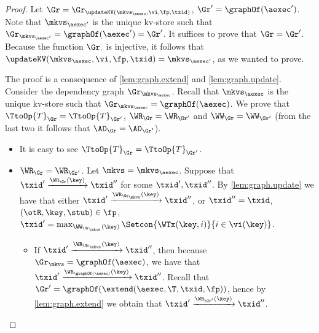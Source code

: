 \begin{proof}
Let $\Gr = \Gr_{\updateKV(\mkvs_{\aexec}, \vi, \fp, \txid)}$, $\Gr' = \graphOf(\aexec')$. 
Note that $\mkvs_{\aexec'}$ is the unique kv-store such that $\Gr_{\mkvs_{\aexec'}} = \graphOf(\aexec') = \Gr'$. 
It suffices to prove that $\Gr = \Gr'$. Because the function $\Gr_{\cdot}$ is injective, it follows that 
$\updateKV(\mkvs_{\aexec}, \vi, \fp, \txid) = \mkvs_{\aexec'}$, as we wanted to prove.  

The proof is a consequence of \cref{lem:graph.extend} and \cref{lem:graph.update}. 
Consider the dependency graph $\Gr_{\mkvs_{\aexec}}$.
Recall that $\mkvs_{\aexec}$ is the unique kv-store such that $\Gr_{\mkvs_{\aexec}} = \graphOf(\aexec)$. 
We prove that $\TtoOp{T}_{\Gr} = \TtoOp{T}_{\Gr'}$, $\WR_{\Gr} = \WR_{\Gr'}$ and 
$\WW_{\Gr} = \WW_{\Gr'}$ (from the last two it follows that $\AD_{\Gr} = \AD_{\Gr'}$). 
\begin{itemize}
\item It is easy to see $\TtoOp{T}_{\Gr} = \TtoOp{T}_{\Gr'}$.

\item $\WR_{\Gr} = \WR_{\Gr'}$.
Let \( \mkvs  = \mkvs_\aexec \).
Suppose that $\txid' \xrightarrow{\WR_{\Gr}(\key)} \txid''$ for some $\txid', \txid''$. 
By \cref{lem:graph.update} we have that either $\txid' \xrightarrow{\WR_{\Gr_\mkvs}(\key)} \txid''$, 
or $\txid'' = \txid$, $(\otR, \key, \stub) \in \fp$, $\txid' = \max_{\WW_{\Gr_\mkvs}(\key)}\Setcon{\WTx(\key, i) }{ i \in \vi(\key)}$. 

\begin{itemize}
\item If $\txid' \xrightarrow{\WR_{\Gr_\mkvs}(\key)} \txid''$, then because 
$\Gr_\mkvs = \graphOf(\aexec)$, we have that $\txid' \xrightarrow{\WR_{\graphOf(\aexec)}(\key)} \txid''$. 
Recall that $\Gr' = \graphOf(\extend(\aexec, \T, \txid, \fp))$, hence by \cref{lem:graph.extend} 
we obtain that $\txid' \xrightarrow{\WR_{\Gr'}(\key)} \txid''$. 


\end{itemize}
\end{itemize}
\end{proof}
